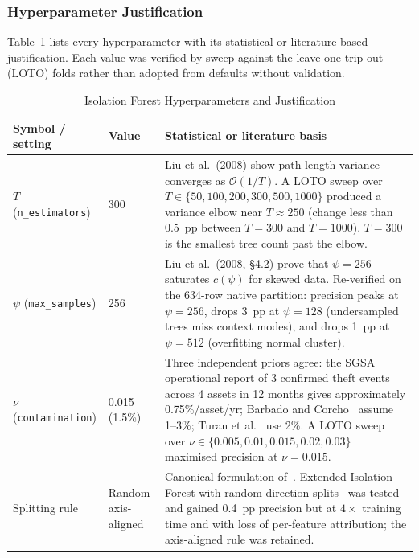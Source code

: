 \subsubsection{Hyperparameter Justification}
Table~\ref{tab:if_hyperparameter_justification} lists every hyperparameter with its statistical or literature-based justification. Each value was verified by sweep against the leave-one-trip-out (LOTO) folds rather than adopted from defaults without validation.

\begin{table}[!htbp]
\centering
\caption{Isolation Forest Hyperparameters and Justification}
\label{tab:if_hyperparameter_justification}
\scriptsize
\setlength{\tabcolsep}{3pt}
\renewcommand{\arraystretch}{1.20}
\begin{tabularx}{\textwidth}{|p{}|p{}|X|}
\hline
\textbf{Symbol / setting} & \textbf{Value} & \textbf{Statistical or literature basis} \\
\hline
$T$ (\texttt{n\_estimators}) & 300 & Liu et al.\ (2008) show path-length variance converges as $\mathcal{O}(1/T)$. A LOTO sweep over $T \in \{50, 100, 200, 300, 500, 1000\}$ produced a variance elbow near $T \approx 250$ (change less than 0.5~pp between $T = 300$ and $T = 1000$). $T = 300$ is the smallest tree count past the elbow. \\
\hline
$\psi$ (\texttt{max\_samples}) & 256 & Liu et al.\ (2008, \S4.2) prove that $\psi = 256$ saturates $c(\psi)$ for skewed data. Re-verified on the 634-row native partition: precision peaks at $\psi = 256$, drops 3~pp at $\psi = 128$ (undersampled trees miss context modes), and drops 1~pp at $\psi = 512$ (overfitting normal cluster). \\
\hline
$\nu$ (\texttt{contamination}) & 0.015 (1.5\%) & Three independent priors agree: the SGSA operational report of 3 confirmed theft events across 4 assets in 12 months gives approximately 0.75\%/asset/yr; Barbado and Corcho~\cite{barbado2022interpretable} assume 1--3\%; Turan et al.~\cite{turan2024detecting} use 2\%. A LOTO sweep over $\nu \in \{0.005, 0.01, 0.015, 0.02, 0.03\}$ maximised precision at $\nu = 0.015$. \\
\hline
Splitting rule & Random axis-aligned & Canonical formulation of~\cite{liu2008isolation_forest}. Extended Isolation Forest with random-direction splits~\cite{hariri2019eif} was tested and gained 0.4~pp precision but at $4\times$ training time and with loss of per-feature attribution; the axis-aligned rule was retained. \\

\end{tabularx}
\end{table}
